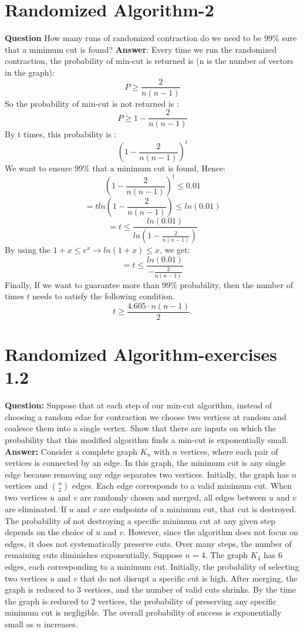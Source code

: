 \documentclass[12pt]{article}
\begin{document}
\section{Randomized Algorithm-2}
\textbf{Question}
How many runs of randomized contraction do we need to be 99\% sure that a minimum cut is found?
\textbf{Answer}:
Every time we run the randomized contraction, the probability of min-cut is returned is (n is the number of vectors in the graph):
\[P\geq\frac{2}{n(n-1)}\]
So the probability of min-cut is not returned is :
\[P\geq1-\frac{2}{n(n-1)}\]
By t times, this probability is :
\[(1-\frac{2}{n(n-1)})^t\]
We want to ensure 99\% that a minimum cut is found, Hence:
\[(1-\frac{2}{n(n-1)})^t\leq0.01\]
\[=tln(1-\frac{2}{n(n-1)})\leq ln(0.01)\]
\[=t\leq \frac{ln(0.01)}{ln(1-\frac{2}{n(n-1)})}\]
By using the \(1+x\leq e^x \rightarrow ln(1+x)\leq x\), we get:
\[=t\leq \frac{ln(0.01)}{-\frac{2}{n(n-1)}}\]
Finally, If we want to guarantee more than 99\% probability, then the number of times \(t\) needs to satisfy the following condition.
\[
t \geq \frac{4.605 \cdot n(n - 1)}{2}.
\]


\section{Randomized Algorithm-exercises 1.2}
\textbf{Question:}
Suppose that at each step of our min-cut algorithm, instead of choosing a random edae for contraction we choose two vertices at random and coalesce them into a single vertex. Show that there are inputs on which the probability that this modified algorithm finds a min-cut is exponentially small.\\
\textbf{Answer:}
Consider a complete graph \( K_n \) with \( n \) vertices, where each pair of vertices is connected by an edge. In this graph, the minimum cut is any single edge because removing any edge separates two vertices. Initially, the graph has \( n \) vertices and \( \binom{n}{2} \) edges. Each edge corresponds to a valid minimum cut. When two vertices \( u \) and \( v \) are randomly chosen and merged, all edges between \( u \) and \( v \) are eliminated. If \( u \) and \( v \) are endpoints of a minimum cut, that cut is destroyed. The probability of not destroying a specific minimum cut at any given step depends on the choice of \( u \) and \( v \). However, since the algorithm does not focus on edges, it does not systematically preserve cuts. Over many steps, the number of remaining cuts diminishes exponentially. Suppose \( n = 4 \). The graph \( K_4 \) has 6 edges, each corresponding to a minimum cut. Initially, the probability of selecting two vertices \( u \) and \( v \) that do not disrupt a specific cut is high. After merging, the graph is reduced to 3 vertices, and the number of valid cuts shrinks. By the time the graph is reduced to 2 vertices, the probability of preserving any specific minimum cut is negligible. The overall probability of success is exponentially small as \( n \) increases.
\end{document}
